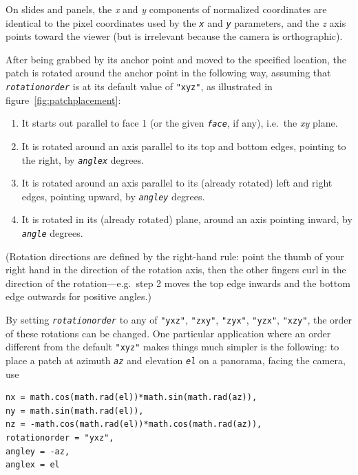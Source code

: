 \documentclass[
	a4paper,
	pagesize,
	10pt,
	oneside,
	idxtotoc,
	bibtotoc,
	BCOR10mm,
	DIV10
]{scrartcl} %
\newcommand{\luaparam}[1]{\texttt{\textit{#1}}}
\begin{document}
On slides and panels, the \textit{x} and \textit{y} components of normalized coordinates are identical to the pixel coordinates used by the \luaparam{x} and \luaparam{y} parameters, and the \textit{z} axis points toward the viewer (but is irrelevant because the camera is orthographic).

After being grabbed by its anchor point and moved to the specified location, the patch is rotated around the anchor point in the following way, assuming that \luaparam{rotationorder} is at its default value of \texttt{"xyz"}, as illustrated in figure~\ref{fig:patchplacement}:
\begin{enumerate}
\item It starts out parallel to face 1 (or the given \luaparam{face}, if any), i.e.\ the \textit{xy} plane.
\item It is rotated around an axis parallel to its top and bottom edges, pointing to the right, by \luaparam{anglex} degrees.
\item It is rotated around an axis parallel to its (already rotated) left and right edges, pointing upward, by \luaparam{angley} degrees.
\item It is rotated in its (already rotated) plane, around an axis pointing inward, by \luaparam{angle} degrees.
\end{enumerate}
(Rotation directions are defined by the right-hand rule: point the thumb of your right hand in the direction of the rotation axis, then the other fingers curl in the direction of the rotation—e.g.\ step 2 moves the top edge inwards and the bottom edge outwards for positive angles.)

By setting \luaparam{rotationorder} to any of \texttt{"yxz"}, \texttt{"zxy"}, \texttt{"zyx"}, \texttt{"yzx"}, \texttt{"xzy"}, the order of these rotations can be changed. One particular application where an order different from the default \texttt{"xyz"} makes things much simpler is the following: to place a patch at azimuth \luaparam{az} and elevation \luaparam{el} on a panorama, facing the camera, use
\begin{Verbatim}[frame=single, framesep=1ex, xleftmargin=0.1\textwidth, xrightmargin=0.1\textwidth, commandchars=\\^\$]
nx = math.cos(math.rad(el))*math.sin(math.rad(az)),
ny = math.sin(math.rad(el)),
nz = -math.cos(math.rad(el))*math.cos(math.rad(az)),
rotationorder = "yxz",
angley = -az,
anglex = el
\end{Verbatim}
\end{document}

